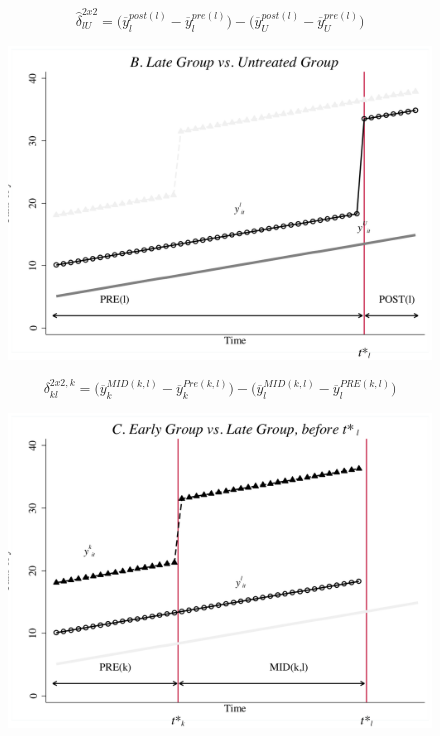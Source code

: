 \documentclass[notes=show]{beamer}
\begin{document}
\begin{frame}[plain]
$$\widehat{\delta}^{2x2}_{lU} = \bigg ( \overline{y}_l^{post(l)} - \overline{y}_l^{pre(l)} \bigg ) - \bigg ( \overline{y}_U^{post(l)} - \overline{y}_U^{pre(l)} \bigg ) $$
	\begin{figure}
	\includegraphics[scale=0.5]{./lecture_includes/bacon_goodman_4.png}
	\end{figure}

\end{frame}


\begin{frame}[plain]

$$\delta_{kl}^{2x2,k} = \bigg ( \overline{y}_k^{MID(k,l)} - \overline{y}_k^{Pre(k,l)} \bigg ) - \bigg ( \overline{y}_l^{MID(k,l)} - \overline{y}_l^{PRE(k,l)} \bigg ) $$

	\begin{figure}
	\includegraphics[scale=0.5]{./lecture_includes/bacon_goodman_6.png}
	\end{figure}

\end{frame}
\end{document}
